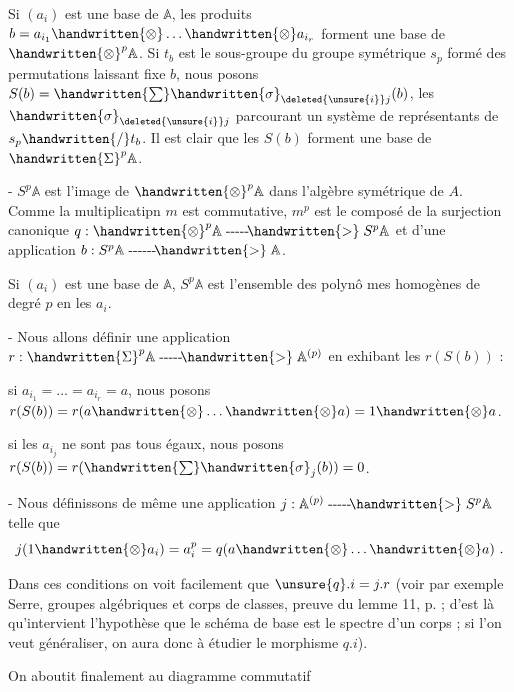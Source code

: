 Si $(a_i)$ est une base de $\mathbb{A}$, les produits $b=a_{i_1}\handwritten{\otimes}\ldots\handwritten{\otimes}a_{i_r}$ forment une base de $\handwritten{\otimes}^{p}\mathbb{A}$. Si $t_b$ est le sous-groupe du groupe symétrique $s_p$ formé des permutations laissant fixe $b$, nous posons $S(b)=\handwritten{\sum}\handwritten{\sigma}_{\deleted{\unsure{i}}j}(b)$, les $\handwritten{\sigma}_{\deleted{\unsure{i}}j}$ parcourant un système de représentants de $s_p\handwritten{/}t_b$. Il est clair que les $S(b)$ forment une base de $\handwritten{\Sigma}^{p}\mathbb{A}$.

\noindent - $S^{p}\mathbb{A}$ est l'image de $\handwritten{\otimes}^{p}\mathbb{A}$ dans l'algèbre symétrique de $A$. Comme la multiplicatipn $m$ est commutative, $m^p$ est le composé de la surjection canonique $q:\handwritten{\otimes}^{p}\mathbb{A}\mathrel{\text{-{}-{}-{}-{}-}\!\handwritten{>}}S^p\mathbb{A}$ et d'une application $b:S^p\mathbb{A}\mathrel{\text{-{}-{}-{}-{}-{}-}\!\handwritten{>}}\mathbb{A}$.

Si $(a_i)$ est une base de $\mathbb{A}$, $S^p\mathbb{A}$ est l'ensemble des polynô mes homogènes de degré $p$ en les $a_i$.

\noindent - Nous allons définir une application $r:\handwritten{\Sigma}^{p}\mathbb{A}\mathrel{\text{-{}-{}-{}-{}-}\!\handwritten{>}}\mathbb{A}^{(p)}$ en exhibant les $r(S(b))$ :

si $a_{i_1}=\ldots=a_{i_r}=a$, nous posons $r(S(b))=r(a\handwritten{\otimes}\ldots\handwritten{\otimes}a)=1\handwritten{\otimes}a$.

si les $a_{i_j}$ ne sont pas tous égaux, nous posons $r(S(b))=r(\handwritten{\sum}\handwritten{\sigma}_j(b))=0$.

\noindent - Nous définissons de même une application $j:\mathbb{A}^{(p)}\mathrel{\text{-{}-{}-{}-{}-}\!\handwritten{>}}S^p\mathbb{A}$ telle que
\[
j(1\handwritten{\otimes}a_i)=a_i^p=q(a\handwritten{\otimes}\ldots\handwritten{\otimes}a)\ .
\]

Dans ces conditions on voit facilement que $\unsure{q}.i=j.r$ (voir par exemple Serre, groupes algébriques et corps de classes, preuve du lemme 11, p. ; d'est là qu'intervient l'hypothèse que le schéma de base est le spectre d'un corps ; si l'on veut généraliser, on aura donc à étudier le morphisme $q.i$).

On aboutit finalement au diagramme commutatif

